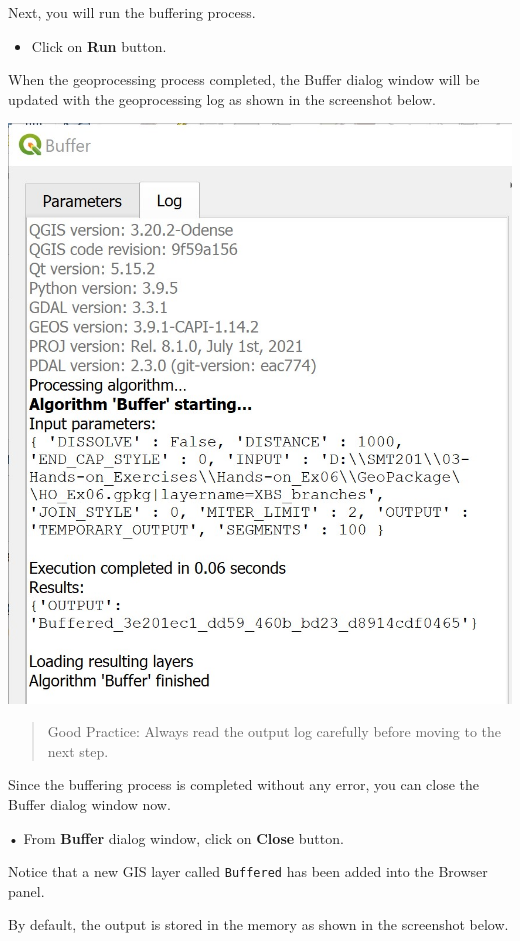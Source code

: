 \documentclass[
  letterpaper,
  DIV=11,
  numbers=noendperiod]{scrreprt}
\providecommand{\tightlist}{%
  \setlength{\itemsep}{0pt}\setlength{\parskip}{0pt}}\usepackage{longtable,booktabs,array}
\begin{document}
Next, you will run the buffering process.

\begin{itemize}
\tightlist
\item
  Click on \textbf{Run} button.
\end{itemize}

When the geoprocessing process completed, the Buffer dialog window will
be updated with the geoprocessing log as shown in the screenshot below.

\includegraphics{./img05/image16.jpg}

\begin{quote}
Good Practice: Always read the output log carefully before moving to the
next step.
\end{quote}

Since the buffering process is completed without any error, you can
close the Buffer dialog window now.

• From \textbf{Buffer} dialog window, click on \textbf{Close} button.

Notice that a new GIS layer called \texttt{Buffered} has been added into
the Browser panel.

By default, the output is stored in the memory as shown in the
screenshot below.
\end{document}
